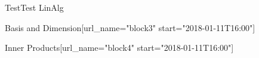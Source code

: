 \documentclass[12pt]{article}
\begin{document}
\begin{edXcourse}{Test}{Test LinAlg}
\begin{edXchapter}{Basis and Dimension}[url_name="block3" start="2018-01-11T16:00"]


% 




\endedxsequential


\end{edXchapter}



\begin{edXchapter}{Inner Products}[url_name="block4" start="2018-01-11T16:00"]

\def\edxbaseoutputname{b4innerprods}











\endedxsequential

\def\edxbaseoutputname{b4projections}











\endedxsequential


\end{edXchapter}



\end{edXcourse}
\end{document}
